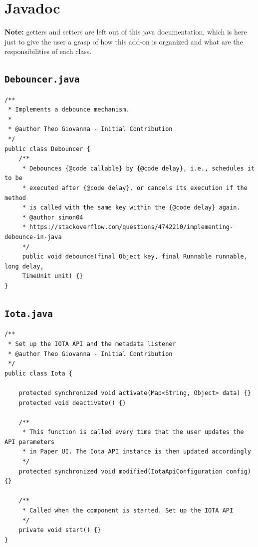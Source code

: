 \documentclass[a4paper,10pt]{article}
\begin{document}
\newpage 

\section{Javadoc}

\textbf{Note:} getters and setters are left out of this java documentation, which is here just to give the user a grasp of how this add-on is organized and what are the responsibilities of each class.

\subsection{\texttt{Debouncer.java}}

\begin{verbatim}
/**
 * Implements a debounce mechanism.
 *
 * @author Theo Giovanna - Initial Contribution
 */
public class Debouncer {
	/**
	 * Debounces {@code callable} by {@code delay}, i.e., schedules it to be
	 * executed after {@code delay}, or cancels its execution if the method 
	 * is called with the same key within the {@code delay} again. 
	 * @author simon04 
	 * https://stackoverflow.com/questions/4742210/implementing-debounce-in-java
	 */
	 public void debounce(final Object key, final Runnable runnable, long delay,
	 TimeUnit unit) {}
}
\end{verbatim}

\subsection{\texttt{Iota.java}}

\begin{verbatim}
/**
 * Set up the IOTA API and the metadata listener
 * @author Theo Giovanna - Initial Contribution
 */
public class Iota {
	
    protected synchronized void activate(Map<String, Object> data) {}
    protected void deactivate() {}
    
    /**
     * This function is called every time that the user updates the API parameters
     * in Paper UI. The Iota API instance is then updated accordingly
     */
    protected synchronized void modified(IotaApiConfiguration config) {}
    
    /**
     * Called when the component is started. Set up the IOTA API
     */
    private void start() {}
}
\end{verbatim}
\end{document}
